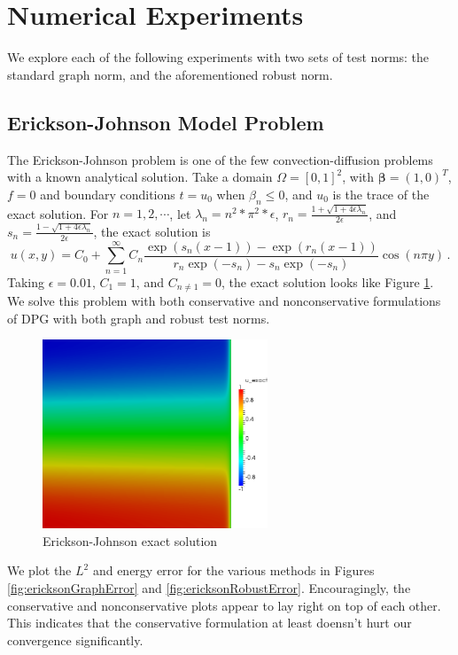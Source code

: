 \documentclass[letterpaper]{article}
\def\bbeta{\boldsymbol\beta}
\begin{document}
\section{Numerical Experiments}
We explore each of the following experiments with two sets of test norms: the
standard graph norm, and the aforementioned robust norm.

\subsection{Erickson-Johnson Model Problem}
The Erickson-Johnson problem is one of the few convection-diffusion problems
with a known analytical solution. Take a domain $\Omega=[0,1]^2$, with
$\bbeta=(1,0)^T$, $f=0$ and boundary conditions $\hat t=u_0$ when
$\beta_n\le0$, and $u_0$ is the trace of the exact solution. For
$n=1,2,\cdots$, let
$\lambda_n=n^2*\pi^2*\epsilon$,
$r_n=\frac{1+\sqrt{1+4\epsilon\lambda_n}}{2\epsilon}$, and 
$s_n=\frac{1-\sqrt{1+4\epsilon\lambda_n}}{2\epsilon}$, the exact solution
is
\begin{equation}
u(x,y)=C_0+\sum_{n=1}^\infty C_n\frac{\exp(s_n(x-1))-\exp(r_n(x-1))}
{r_n\exp(-s_n)-s_n\exp(-s_n)}\cos(n\pi y)\,.
\label{eq:ericksonExact}
\end{equation}
Taking $\epsilon=0.01$, $C_1=1$, and $C_{n\neq1}=0$, the exact solution looks
like Figure \ref{fig:erickson}. We solve this problem with both conservative
and nonconservative formulations of DPG with both graph and robust test norms.

\begin{figure}[h!]
\centering
\includegraphics[width=0.6\textwidth]{figs/Erickson/exact.png}
\caption{Erickson-Johnson exact solution}
\label{fig:erickson}
\end{figure}

We plot the $L^2$ and energy error for the various methods in Figures
\ref{fig:ericksonGraphError} and \ref{fig:ericksonRobustError}. Encouragingly,
the conservative and nonconservative plots appear to lay right on top of each
other. This indicates that the conservative formulation at least doensn't hurt
our convergence significantly.
\end{document}

